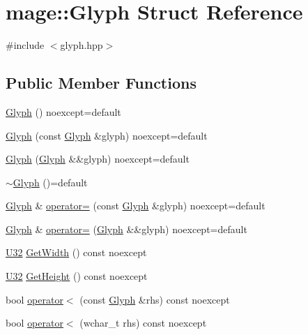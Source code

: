\hypertarget{structmage_1_1_glyph}{}\section{mage\+:\+:Glyph Struct Reference}
\label{structmage_1_1_glyph}


{\ttfamily \#include $<$glyph.\+hpp$>$}

\subsection*{Public Member Functions}
\begin{DoxyCompactItemize}
\item 
\hyperlink{structmage_1_1_glyph_aae91987833c1a89f6ce416d22544bb4b}{Glyph} () noexcept=default
\item 
\hyperlink{structmage_1_1_glyph_a6915f88bb426261e67f243629509f9a9}{Glyph} (const \hyperlink{structmage_1_1_glyph}{Glyph} \&glyph) noexcept=default
\item 
\hyperlink{structmage_1_1_glyph_a823494adc2f56bee49c3f9e498638f60}{Glyph} (\hyperlink{structmage_1_1_glyph}{Glyph} \&\&glyph) noexcept=default
\item 
\hyperlink{structmage_1_1_glyph_aa8e903334e77cc2930149923461d06ab}{$\sim$\+Glyph} ()=default
\item 
\hyperlink{structmage_1_1_glyph}{Glyph} \& \hyperlink{structmage_1_1_glyph_a4cc57bb9e8ba26d625b75e6557415f8d}{operator=} (const \hyperlink{structmage_1_1_glyph}{Glyph} \&glyph) noexcept=default
\item 
\hyperlink{structmage_1_1_glyph}{Glyph} \& \hyperlink{structmage_1_1_glyph_a7562e4fbcafb0633ec2c6db5b5160670}{operator=} (\hyperlink{structmage_1_1_glyph}{Glyph} \&\&glyph) noexcept=default
\item 
\hyperlink{namespacemage_a41c104c036fba3756a74e19f793eeaa1}{U32} \hyperlink{structmage_1_1_glyph_a672de806086fa9f23832d9f8e617fc3f}{Get\+Width} () const noexcept
\item 
\hyperlink{namespacemage_a41c104c036fba3756a74e19f793eeaa1}{U32} \hyperlink{structmage_1_1_glyph_a05deaaf61096d41cda1d85ef0488b36e}{Get\+Height} () const noexcept
\item 
bool \hyperlink{structmage_1_1_glyph_a7bb41307f74973e4bc547193dedc8dcc}{operator$<$} (const \hyperlink{structmage_1_1_glyph}{Glyph} \&rhs) const noexcept
\item 
bool \hyperlink{structmage_1_1_glyph_ad8e9835022217afef429f38891bba80e}{operator$<$} (wchar\+\_\+t rhs) const noexcept
\end{DoxyCompactItemize}
